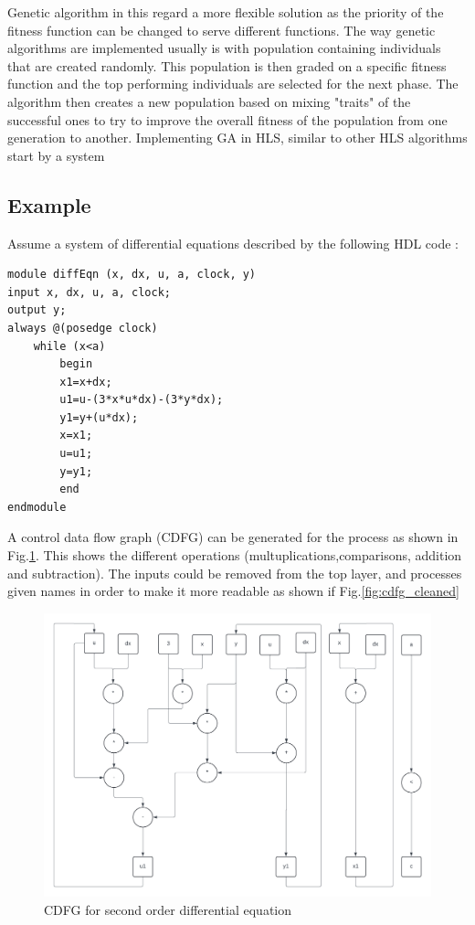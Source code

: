 \documentclass[conference]{IEEEtran}
\begin{document}
Genetic algorithm in this regard a more flexible solution as the priority of the fitness function can be changed to serve different functions. The way genetic algorithms are implemented usually is with population containing individuals that are created randomly. This population is then graded on a specific fitness function and the top performing individuals are selected for the next phase. The algorithm then creates a new population based on mixing "traits" of the successful ones to try to improve the overall fitness of the population from one generation to another.
Implementing GA in HLS, similar to other HLS algorithms start by a system 
\subsection{Example}
Assume a system of differential equations described by the following HDL code :
\begin{verbatim}
module diffEqn (x, dx, u, a, clock, y)
input x, dx, u, a, clock;
output y;
always @(posedge clock)
    while (x<a)
        begin
        x1=x+dx;
        u1=u-(3*x*u*dx)-(3*y*dx);
        y1=y+(u*dx);
        x=x1;
        u=u1;
        y=y1;
        end
endmodule
\end{verbatim}
A control data flow graph (CDFG) can be generated for the process as shown in Fig.\ref{fig:CDFG}. This shows the different operations (multuplications,comparisons, addition and subtraction). The inputs could be removed from the top layer, and processes given names in order to make it more readable as shown if Fig.\ref{fig:cdfg_cleaned}
\begin{figure}[h]
    \centering
    \includegraphics[scale=0.3]{cdfg.png}
    \caption{CDFG for second order differential equation}
    \label{fig:CDFG}
\end{figure}
\end{document}
